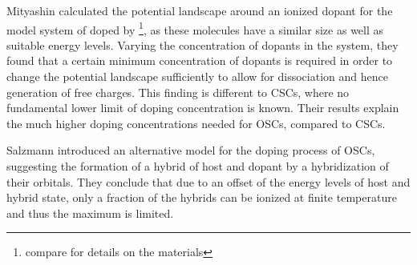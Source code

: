 Mityashin\etal\cite{Mityashin2012a} calculated the potential landscape around an ionized dopant for the model system of \pen doped by \FV\footnote{compare  for details on the materials}, as these molecules have a similar size as well as suitable energy levels. Varying the concentration of dopants in the system, they found that a certain minimum concentration of dopants is required in order to change the potential landscape sufficiently to allow for dissociation and hence generation of free charges. This finding is different to CSCs, where no fundamental lower limit of doping concentration is known.
Their results explain the much higher doping concentrations needed for OSCs, compared to CSCs.

Salzmann\etal\cite{Salzmann2012} introduced an alternative model for the doping process of OSCs, suggesting the formation of a hybrid of host and dopant by a hybridization of their orbitals. They conclude that due to an offset of the energy levels of host and hybrid state, only a fraction of the hybrids can be ionized at finite temperature and thus the maximum \nLong is limited.

